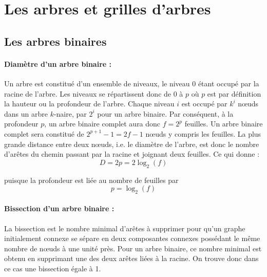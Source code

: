\section{Les arbres et grilles d'arbres}

\subsection{Les arbres binaires}
\paragraph{Diamètre d'un arbre binaire : } Un arbre est constitué d'un ensemble de niveaux, le niveau 0 étant occupé par la racine de l'arbre.
Les niveaux se répartissent donc de 0 à $p$ où $p$ est par définition la hauteur ou la profondeur de l'arbre. Chaque niveau $i$ est occupé 
par $k^{i}$  nœuds dans un arbre $k$-naire, par $2^{i}$ pour un arbre binaire. 
Par conséquent, à la profondeur $p$, un arbre binaire complet aura donc $f = 2^{p}$ 
feuilles. Un arbre binaire complet sera constitué de $2^{p+1}-1 = 2f-1$ nœuds y compris les feuilles.
La plus grande distance entre deux nœuds, i.e. le diamètre de l'arbre, est donc le nombre d'arêtes 
du chemin passant par la racine et joignant deux feuilles. Ce qui donne : \[D = 2p = 2\log_2(f)\]


puisque la profondeur est liée au nombre de feuilles par \[p = \log_2(f)\]


\paragraph{Bissection d'un arbre binaire : } La bissection est le nombre minimal d'arêtes à supprimer pour qu'un graphe initialement
connexe se sépare en deux composantes connexes possédant le même nombre de nœuds à une unité près.
Pour un arbre binaire, ce nombre minimal est obtenu en supprimant une des deux arêtes liées à la racine. On trouve
donc dans ce cas une bissection égale à 1.

